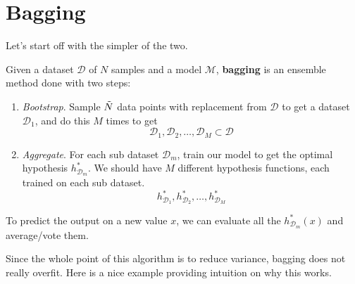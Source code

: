 \section{Bagging}

  Let's start off with the simpler of the two. 

  \begin{definition}
    Given a dataset $\mathcal{D}$ of $N$ samples and a model $\mathcal{M}$, \textbf{bagging} is an ensemble method done with two steps: 
    \begin{enumerate}
      \item \textit{Bootstrap}. Sample $\Tilde{N}$ data points with replacement from $\mathcal{D}$ to get a dataset $\mathcal{D}_1$, and do this $M$ times to get 
      \[\mathcal{D}_1, \mathcal{D}_2, \ldots, \mathcal{D}_M \subset \mathcal{D}\]
      \item \textit{Aggregate}. For each sub dataset $\mathcal{D}_m$, train our model to get the optimal hypothesis $h_{\mathcal{D}_m}^\ast$. We should have $M$ different hypothesis functions, each trained on each sub dataset. 
      \[h_{\mathcal{D}_1}^\ast, h_{\mathcal{D}_2}^\ast, \ldots, h_{\mathcal{D}_M}^\ast\]
    \end{enumerate}
    To predict the output on a new value $x$, we can evaluate all the $h_{\mathcal{D}_m}^\ast (x)$ and average/vote them.
  \end{definition}

  Since the whole point of this algorithm is to reduce variance, bagging does not really overfit. Here is a nice example providing intuition on why this works. 

